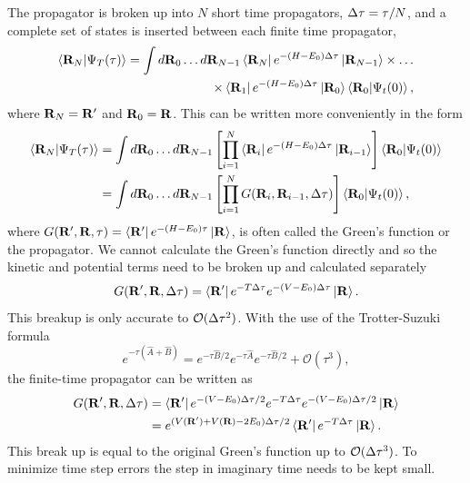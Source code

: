The propagator is broken up into $N$ short time propagators, $\Delta\tau = \tau/N$, and a complete set of states is inserted between each finite time propagator,
\begin{equation}
\begin{split}
   \left< \mathbf{R}_N | \Psi_T(\tau) \right> = \int d\mathbf{R}_0 \ldots d\mathbf{R}_{N-1} \left< \mathbf{R}_N \right|e^{-(H-E_0)\Delta\tau}\left| \mathbf{R}_{N-1} \right> \times \ldots \\
      \times \left< \mathbf{R}_1 \right|e^{-(H-E_0)\Delta\tau}\left| \mathbf{R}_{0} \right> \left< \mathbf{R}_0 | \Psi_t(0) \right>,
\end{split}
\end{equation}
where $\mathbf{R}_N=\mathbf{R}'$ and $\mathbf{R}_0=\mathbf{R}$. This can be written more conveniently in the form
\begin{align}
   \left< \mathbf{R}_N | \Psi_T(\tau) \right> &= \int d\mathbf{R}_0 \ldots d\mathbf{R}_{N-1} \left[\prod\limits_{i=1}^N \left< \mathbf{R}_i \right|e^{-(H-E_0)\Delta\tau}\left| \mathbf{R}_{i-1} \right>\right] \left< \mathbf{R}_0 | \Psi_t(0) \right> \\
   &= \int d\mathbf{R}_0 \ldots d\mathbf{R}_{N-1} \left[\prod\limits_{i=1}^N G(\mathbf{R}_i,\mathbf{R}_{i-1},\Delta\tau)\right] \left< \mathbf{R}_0 | \Psi_t(0) \right>,
\end{align}
where $G(\mathbf{R}',\mathbf{R},\tau)=\left< \mathbf{R}' \right|e^{-(H-E_0)\tau}\left| \mathbf{R} \right>$, is often called the Green's function or the propagator. We cannot calculate the Green's function directly and so the kinetic and potential terms need to be broken up and calculated separately
\begin{equation}
   G(\mathbf{R}',\mathbf{R},\Delta\tau) = \left< \mathbf{R}' \right|e^{-T\Delta\tau}e^{-(V-E_0)\Delta\tau}\left| \mathbf{R} \right>.
\end{equation}
This breakup is only accurate to $\mathcal{O}(\Delta\tau^2)$. With the use of the Trotter-Suzuki formula
\begin{equation}
   e^{-\tau\left(\hat{A}+\hat{B}\right)} = e^{-\tau\hat{B}/2}e^{-\tau\hat{A}}e^{-\tau\hat{B}/2} + \mathcal{O}(\tau^3),
\end{equation}
the finite-time propagator can be written as
\begin{align}
   G(\mathbf{R}',\mathbf{R},\Delta\tau) &= \left< \mathbf{R}' \right|e^{-(V-E_0)\Delta\tau/2}e^{-T\Delta\tau}e^{-(V-E_0)\Delta\tau/2}\left| \mathbf{R} \right> \\
   &= e^{(V(\mathbf{R}')+V(\mathbf{R})-2E_0)\Delta\tau/2}\left< \mathbf{R}' \right|e^{-T\Delta\tau}\left| \mathbf{R} \right>.
\end{align}
This break up is equal to the original Green's function up to $\mathcal{O}(\Delta\tau^3)$. To minimize time step errors the step in imaginary time needs to be kept small.

